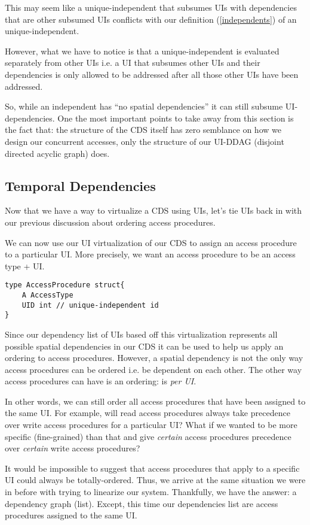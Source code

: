 This may seem like a unique-independent that subsumes UIs with dependencies that are other subsumed UIs conflicts with our definition (\ref{independents}) of an unique-independent. 

However, what we have to notice is that a unique-independent is evaluated separately from other UIs i.e. a UI that subsumes other UIs and their dependencies is only allowed to be addressed after all those other UIs have been addressed.

So, while an independent has ``no spatial dependencies'' it can still subsume UI-dependencies. One the most important points to take away from this section is the fact that: the structure of the CDS itself has zero semblance on how we design our concurrent accesses, only the structure of our UI-DDAG (disjoint directed acyclic graph) does.

\subsection{Temporal Dependencies}

Now that we have a way to virtualize a CDS using UIs, let's tie UIs back in with our previous discussion about ordering access procedures.

We can now use our UI virtualization of our CDS to assign an access procedure to a particular UI. More precisely, we want an access procedure to be an access type + UI.

\begin{verbatim}
type AccessProcedure struct{
	A AccessType
	UID int // unique-independent id
}
\end{verbatim}

Since our dependency list of UIs based off this virtualization represents all possible spatial dependencies in our CDS it can be used to help us apply an ordering to access procedures. However, a spatial dependency is not the only way access procedures can be ordered i.e. be dependent on each other. The other way access procedures can have is an ordering: is \textit{per UI}.

In other words, we can still order all access procedures that have been assigned to the same UI. For example, will read access procedures always take precedence over write access procedures for a particular UI? What if we wanted to be more specific (fine-grained) than that and give \textit{certain} access procedures precedence over \textit{certain} write access procedures?

It would be impossible to suggest that access procedures that apply to a specific UI could always be totally-ordered. Thus, we arrive at the same situation we were in before with trying to linearize our system. Thankfully, we have the answer: a dependency graph (list). Except, this time our dependencies list are access procedures assigned to the same UI. 

